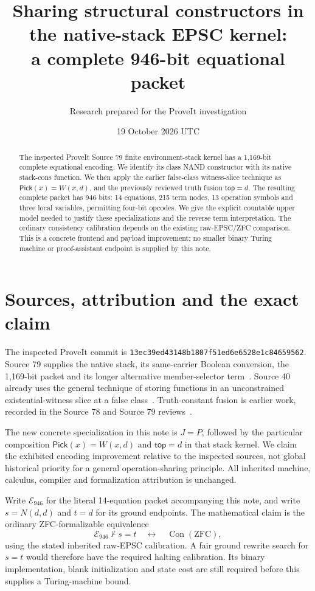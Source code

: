 \documentclass[11pt]{article}
\title{Sharing structural constructors in the native-stack EPSC kernel:\\a complete 946-bit equational packet}
\author{Research prepared for the ProveIt investigation}
\date{19 October 2026 UTC}
\newcommand{\Con}{\operatorname{Con}}
\begin{document}
\maketitle

\begin{abstract}
The inspected ProveIt Source 79 finite environment-stack kernel has a
1,169-bit complete equational encoding. We identify its class NAND
constructor with its native stack-cons function. We then apply the earlier
false-class witness-slice technique as $\mathsf{Pick}(x)=W(x,d)$, and the
previously reviewed truth fusion $\mathsf{top}=d$. The resulting complete
packet has 946 bits: 14 equations, 215 term nodes, 13 operation symbols and
three local variables, permitting four-bit opcodes. We give the explicit
countable upper model needed to justify these specializations and the
reverse term interpretation. The ordinary consistency calibration depends
on the existing raw-EPSC/ZFC comparison. This is a concrete frontend and
payload improvement; no smaller binary Turing machine or proof-assistant
endpoint is supplied by this note.
\end{abstract}

\section{Sources, attribution and the exact claim}

The inspected ProveIt commit is
\texttt{13ec39ed43148b1807f51ed6e6528e1c84659562}.
Source 79 supplies the native stack, its same-carrier Boolean conversion,
the 1,169-bit packet and its longer alternative member-selector
term~\cite{stack79}. Source 40 already uses the general technique of
storing functions in an unconstrained existential-witness slice at a false
class~\cite{kernel40}. Truth-constant fusion is earlier work, recorded in
the Source 78 and Source 79 reviews~\cite{review79}.

The new concrete specialization in this note is $J=P$, followed by the
particular composition $\mathsf{Pick}(x)=W(x,d)$ and
$\mathsf{top}=d$ in that stack kernel. We claim the exhibited encoding
improvement relative to the inspected sources, not global historical
priority for a general operation-sharing principle. All inherited machine,
calculus, compiler and formalization attribution is unchanged.

Write $\mathcal E_{946}$ for the literal 14-equation packet accompanying
this note, and write $s=N(d,d)$ and $t=d$ for its ground endpoints. The
mathematical claim is the ordinary ZFC-formalizable equivalence
\[
 \mathcal E_{946}\not\vdash s=t\quad\longleftrightarrow\quad
 \Con(\mathrm{ZFC}),
\]
using the stated inherited raw-EPSC calibration. A fair ground rewrite
search for $s=t$ would therefore have the required halting calibration.
Its binary implementation, blank initialization and state cost are still
required before this supplies a Turing-machine bound.
\end{document}
